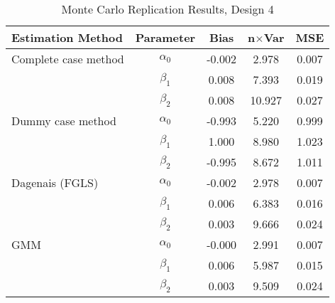 \begin{table}
\centering
\caption{Monte Carlo Replication Results, Design 4}
\label{table:MCReplicationResultsDesign4}
\begin{tabular}{lcccc}
\toprule
Estimation Method & Parameter & Bias & n$\times$Var & MSE \\
\midrule
Complete case method & $\alpha_0$ & -0.002 & 2.978 & 0.007 \\
 & $\beta_1$ & 0.008 & 7.393 & 0.019 \\
 & $\beta_2$ & 0.008 & 10.927 & 0.027 \\
Dummy case method & $\alpha_0$ & -0.993 & 5.220 & 0.999 \\
 & $\beta_1$ & 1.000 & 8.980 & 1.023 \\
 & $\beta_2$ & -0.995 & 8.672 & 1.011 \\
Dagenais (FGLS) & $\alpha_0$ & -0.002 & 2.978 & 0.007 \\
 & $\beta_1$ & 0.006 & 6.383 & 0.016 \\
 & $\beta_2$ & 0.003 & 9.666 & 0.024 \\
GMM & $\alpha_0$ & -0.000 & 2.991 & 0.007 \\
 & $\beta_1$ & 0.006 & 5.987 & 0.015 \\
 & $\beta_2$ & 0.003 & 9.509 & 0.024 \\
\bottomrule
\end{tabular}
\end{table}
